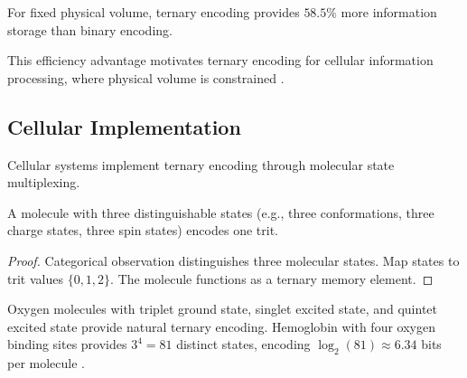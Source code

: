 \begin{corollary}
For fixed physical volume, ternary encoding provides $58.5\%$ more information storage than binary encoding.
\end{corollary}

This efficiency advantage motivates ternary encoding for cellular information processing, where physical volume is constrained \citep{hayes2001ternary}.

\subsection{Cellular Implementation}

Cellular systems implement ternary encoding through molecular state multiplexing.

\begin{proposition}
A molecule with three distinguishable states (e.g., three conformations, three charge states, three spin states) encodes one trit.
\end{proposition}

\begin{proof}
Categorical observation distinguishes three molecular states. Map states to trit values $\{0,1,2\}$. The molecule functions as a ternary memory element.
\end{proof}

Oxygen molecules with triplet ground state, singlet excited state, and quintet excited state provide natural ternary encoding. Hemoglobin with four oxygen binding sites provides $3^4 = 81$ distinct states, encoding $\log_2(81) \approx 6.34$ bits per molecule \citep{perutz1970stereochemistry}.

